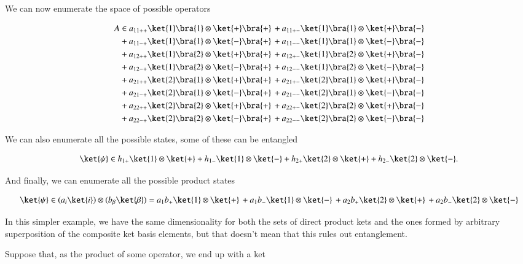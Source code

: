 We can now enumerate the space of possible operators

\begin{align*}
A &\in
a_{11++} \ket{1}\bra{1} \otimes \ket{+}\bra{+}
\,+ a_{11+-} \ket{1}\bra{1} \otimes \ket{+}\bra{-} \\
&+ a_{11-+} \ket{1}\bra{1} \otimes \ket{-}\bra{+}
\,+ a_{11--} \ket{1}\bra{1} \otimes \ket{-}\bra{-} \\
&+ a_{12++} \ket{1}\bra{2} \otimes \ket{+}\bra{+}
\,+ a_{12+-} \ket{1}\bra{2} \otimes \ket{+}\bra{-} \\
&+ a_{12-+} \ket{1}\bra{2} \otimes \ket{-}\bra{+}
\,+ a_{12--} \ket{1}\bra{2} \otimes \ket{-}\bra{-} \\
&+ a_{21++} \ket{2}\bra{1} \otimes \ket{+}\bra{+}
\,+ a_{21+-} \ket{2}\bra{1} \otimes \ket{+}\bra{-} \\
&+ a_{21-+} \ket{2}\bra{1} \otimes \ket{-}\bra{+}
\,+ a_{21--} \ket{2}\bra{1} \otimes \ket{-}\bra{-} \\
&+ a_{22++} \ket{2}\bra{2} \otimes \ket{+}\bra{+}
\,+ a_{22+-} \ket{2}\bra{2} \otimes \ket{+}\bra{-} \\
&+ a_{22-+} \ket{2}\bra{2} \otimes \ket{-}\bra{+}
\,+ a_{22--} \ket{2}\bra{2} \otimes \ket{-}\bra{-}
\end{align*}

We can also enumerate all the possible states, some of these can be entangled

\begin{align*}
\ket{\psi} \in h_{1+} \ket{1} \otimes \ket{+}
+ h_{1-} \ket{1} \otimes \ket{-}
+ h_{2+} \ket{2} \otimes \ket{+}
+ h_{2-} \ket{2} \otimes \ket{-}.
\end{align*}

And finally, we can enumerate all the possible product states

\begin{align*}
\ket{\psi} \in
 (a_{i} \ket{i}) \otimes (b_{\beta} \ket{\beta})
=
 a_{1} b_{+} \ket{1} \otimes \ket{+}
\,+ a_{1} b_{-} \ket{1} \otimes \ket{-}
\,+ a_{2} b_{+} \ket{2} \otimes \ket{+}
\,+ a_{2} b_{-} \ket{2} \otimes \ket{-}
\end{align*}

In this simpler example, we have the same dimensionality for both the sets of direct product kets and the ones formed by arbitrary superposition of the composite ket basis elements, but that doesn't mean that this rules out entanglement.

Suppose that, as the product of some operator, we end up with a ket

